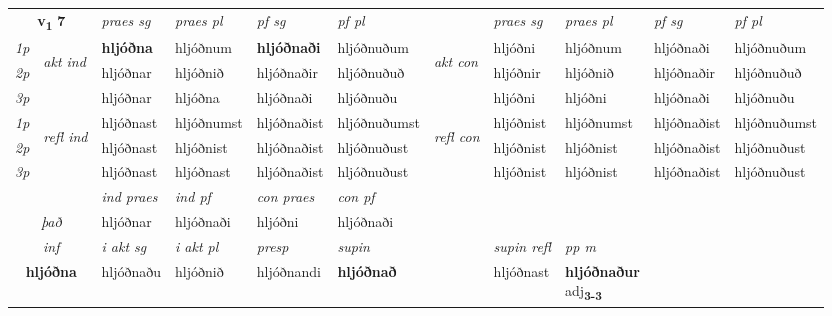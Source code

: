 \noindent
\begin{tabular}{lllllllllll} \toprule
\multicolumn{2}{c}{\textbf{v{\textsubscript{1}}} \Large{\textbf{7}}}  &  \textit{praes sg}  & \textit{praes pl}  &\textit{ pf sg} & \textit{pf pl} &  &  \textit{praes sg}  & \textit{praes pl}  & \textit{pf sg} & \textit{pf pl } \\*
	\cmidrule{3-6} \cmidrule{8-11}
 {\textit{1p}} & \multirow{3}{*}{\begin{turn}{90}\textit{akt ind}\end{turn}} & \textbf{hljóðna} & hljóðnum & \textbf{hljóðnaði} & hljóðnuðum & \multirow{3}{*}{\begin{turn}{90}\textit{akt con}\end{turn}} &hljóðni & hljóðnum & hljóðnaði & hljóðnuðum\\*
 {\textit{2p}} &  &  hljóðnar  & hljóðnið & hljóðnaðir & hljóðnuðuð & & hljóðnir & hljóðnið & hljóðnaðir & hljóðnuðuð \\*
{\textit{3p}} &  & hljóðnar & hljóðna & hljóðnaði & hljóðnuðu & & hljóðni & hljóðni& hljóðnaði & hljóðnuðu \\*
\cmidrule{3-6} \cmidrule{8-11}
 {\textit{1p}} & \multirow{3}{*}{\begin{turn}{90}\textit{refl ind}\end{turn}}  & hljóðnast & hljóðnumst & hljóðnaðist & hljóðnuðumst & \multirow{3}{*}{\begin{turn}{90}\textit{refl con}\end{turn}}  &hljóðnist & hljóðnumst & hljóðnaðist & hljóðnuðumst \\*
 {\textit{2p}} &  & hljóðnast & hljóðnist & hljóðnaðist & hljóðnuðust & &hljóðnist & hljóðnist & hljóðnaðist & hljóðnuðust \\*
 {\textit{3p}}  & & hljóðnast & hljóðnast & hljóðnaðist & hljóðnuðust & & hljóðnist & hljóðnist& hljóðnaðist & hljóðnuðust \\*
\cmidrule{3-6} \cmidrule{8-11}

   & &  \textit{ind praes} & \textit{ind pf} & \textit{con praes} & \textit{con pf} \\*
\multicolumn{2}{c}{ \textit{það} } & hljóðnar & hljóðnaði & hljóðni & hljóðnaði \\*

\cmidrule{3-9}
   \multicolumn{2}{c}{\textit{inf}}  & \textit{i akt sg} & \textit{i akt pl}   & \textit{presp} & \textit{supin} && \textit{supin refl} & \textit{pp m} \\*
  \multicolumn{2}{c}{\textbf{hljóðna}} & hljóðnaðu  & hljóðnið   & hljóðnandi &  \textbf{hljóðnað} && hljóðnast & \specialcell{\textbf{hljóðnaður} \\ adj\textbf{\textsubscript{3-3}}} \\*
\end{tabular}

